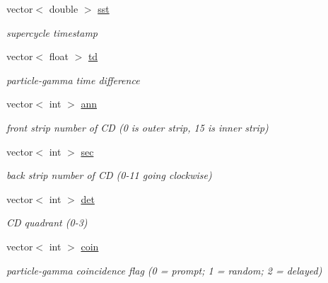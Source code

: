 \begin{DoxyCompactItemize}
\mbox{\label{classmbevts_a6c752c13012ca9fa78cd889d2d2f4a3d}} 
vector$<$ double $>$ \hyperlink{classmbevts_a6c752c13012ca9fa78cd889d2d2f4a3d}{sst}
\begin{DoxyCompactList}\small\item\em supercycle timestamp \end{DoxyCompactList}\item 
\mbox{\label{classmbevts_a577bfcdc97c54ad53a452200dff118e2}} 
vector$<$ float $>$ \hyperlink{classmbevts_a577bfcdc97c54ad53a452200dff118e2}{td}
\begin{DoxyCompactList}\small\item\em particle-\/gamma time difference \end{DoxyCompactList}\item 
\mbox{\label{classmbevts_a76cdc10ec6f7b2f249d7dbd52571825c}} 
vector$<$ int $>$ \hyperlink{classmbevts_a76cdc10ec6f7b2f249d7dbd52571825c}{ann}
\begin{DoxyCompactList}\small\item\em front strip number of CD (0 is outer strip, 15 is inner strip) \end{DoxyCompactList}\item 
\mbox{\label{classmbevts_a4f155f19153b57357f4596fdca3bf13b}} 
vector$<$ int $>$ \hyperlink{classmbevts_a4f155f19153b57357f4596fdca3bf13b}{sec}
\begin{DoxyCompactList}\small\item\em back strip number of CD (0-\/11 going clockwise) \end{DoxyCompactList}\item 
\mbox{\label{classmbevts_aa61c98b5a4c645e818f6b8767a7b3b54}} 
vector$<$ int $>$ \hyperlink{classmbevts_aa61c98b5a4c645e818f6b8767a7b3b54}{det}
\begin{DoxyCompactList}\small\item\em CD quadrant (0-\/3) \end{DoxyCompactList}\item 
\mbox{\label{classmbevts_a306023f221da7deacd3abd790c714687}} 
vector$<$ int $>$ \hyperlink{classmbevts_a306023f221da7deacd3abd790c714687}{coin}
\begin{DoxyCompactList}\small\item\em particle-\/gamma coincidence flag (0 = prompt; 1 = random; 2 = delayed) \end{DoxyCompactList}\item 

\end{DoxyCompactItemize}
